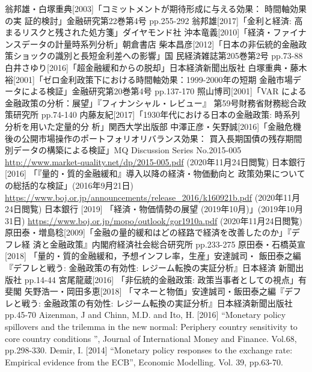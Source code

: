 \documentclass[12pt]{jarticle}
\begin{document}
{
\begin{thebibliography}{99}
  \bibitem{}  翁邦雄・白塚重典[2003]「コミットメントが期待形成に与える効果： 時間軸効果の実
  証的検討」金融研究第22巻第4号 pp.255-292
  \bibitem{} 翁邦雄[2017]「金利と経済: 高まるリスクと残された処方箋」ダイヤモンド社
  \bibitem{} 沖本竜義[2010]「経済・ファイナンスデータの計量時系列分析」朝倉書店
  \bibitem{} 柴本昌彦[2012]「日本の非伝統的金融政策ショックの識別と長短金利差への影響」国
  民経済雑誌第205巻第2号 pp.73-88
  \bibitem{} 白井さゆり[2016]「超金融緩和からの脱却」日本経済新聞出版社
  \bibitem{} 白塚重典・藤木裕[2001]「ゼロ金利政策下における時間軸効果：1999-2000年の短期
  金融市場データによる検証」金融研究第20巻第4号 pp.137-170
  \bibitem{} 照山博司[2001]「VAR による金融政策の分析：展望」『フィナンシャル・レビュー』
  第59号財務省財務総合政策研究所 pp.74-140
  \bibitem{} 内藤友紀[2017]「1930年代における日本の金融政策: 時系列分析を用いた定量的分
  析」関西大学出版部
  \bibitem{} 中澤正彦・矢野誠[2016]「金融危機後の公開市場操作のポートフォリオリバランス効果：
  買入長期国債の残存期間別データの構築による検証」MQ Discussion Series No.2015-005
  \url{http://www.market-quality.net/dp/2015-005.pdf} (2020年11月24日閲覧)
  \bibitem{} 日本銀行 [2016] 「『量的・質的金融緩和』導入以降の経済・物価動向と
  政策効果についての総括的な検証」(2016年9月21日) \url{https://www.boj.or.jp/announcements/release_2016/k160921b.pdf} (2020年11月24日閲覧)
  \bibitem{} 日本銀行 [2019] 「経済・物価情勢の展望 (2019年10月)」(2019年10月31日) \url{https://www.boj.or.jp/mopo/outlook/gor1910a.pdf} (2020年11月24日閲覧)
  \bibitem{} 原田泰・増島稔[2009]「金融の量的緩和はどの経路で経済を改善したのか」『デフレ経
  済と金融政策』内閣府経済社会総合研究所 pp.233-275
  \bibitem{} 原田泰・石橋英宣[2018] 「量的・質的金融緩和，予想インフレ率，生産」安達誠司・
  飯田泰之編『デフレと戦う: 金融政策の有効性: レジーム転換の実証分析』日本経済
  新聞出版社 pp.14-44
  \bibitem{} 宮尾龍蔵[2016] 「非伝統的金融政策: 政策当事者としての視点」有斐閣
  \bibitem{} 矢野浩一・岡田多恵[2018] 「マネーと物価」安達誠司・飯田泰之編『デフレと戦う:
  金融政策の有効性: レジーム転換の実証分析』日本経済新聞出版社 pp.45-70
  \bibitem{} Aizenman, J and Chinn, M.D. and Ito, H. [2016] “Monetary policy spillovers and the
  trilemma in the new normal: Periphery country sensitivity to core country conditions
  ”, Journal of International Money and Finance. Vol.68, pp.298-330.
  \bibitem{} Demir, I. [2014] “Monetary policy responses to the exchange rate: Empirical evidence
  from the ECB”, Economic Modelling. Vol. 39, pp.63-70.

\end{thebibliography}}
\end{document}
